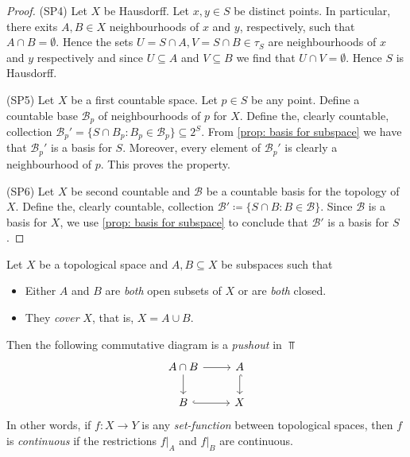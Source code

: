 \begin{proof}
(SP4) Let \(X\) be Hausdorff. Let \(x, y \in S\) be distinct points. In
particular, there exits \(A, B \in X\) neighbourhoods of \(x\) and \(y\),
respectively, such that \(A \cap B = \emptyset\). Hence the sets \(U = S \cap
A, V = S \cap B \in \tau_S\) are neighbourhoods of \(x\) and \(y\)
respectively and since \(U \subseteq A\) and \(V \subseteq B\) we find that
\(U \cap V = \emptyset\). Hence \(S\) is Hausdorff.

(SP5) Let \(X\) be a first countable space. Let \(p \in S\) be any point.
Define a countable base \(\mathcal B_p\) of neighbourhoods of \(p\) for \(X\).
Define the, clearly countable, collection
\(\mathcal B_p' = \{S \cap B_p \colon B_p \in \mathcal B_p\} \subseteq
2^S\). From \cref{prop: basis for subspace} we have that \(\mathcal B_p'\) is a
basis for \(S\). Moreover, every element of \(\mathcal B_p'\) is clearly a
neighbourhood of \(p\). This proves the property.

(SP6) Let \(X\) be second countable and \(\mathcal B\) be a countable basis for
the topology of \(X\). Define the, clearly countable, collection
\(\mathcal B' \coloneq \{S \cap B \colon B \in \mathcal B\}\). Since
\(\mathcal B\) is a basis for \(X\), we use \cref{prop: basis for subspace} to
conclude that \(\mathcal B'\) is a basis for \(S\).
\end{proof}

\begin{proposition}
\label{prop:continuous-from-covering-subspaces}
Let \(X\) be a topological space and \(A, B \subseteq X\) be subspaces such that
\begin{itemize}\setlength\itemsep{0em}
\item Either \(A\) and \(B\) are \emph{both} open subsets of \(X\) or are
  \emph{both} closed.

\item They \emph{cover} \(X\), that is, \(X = A \cup B\).
\end{itemize}
Then the following commutative diagram is a \emph{pushout} in \(\Top\)
\begin{equation}\label{eq:pushout-AcapB}
\begin{tikzcd}
A \cap B \ar[r] \ar[d] & A \ar[d, hook] \\
B \ar[r, hook] & X
\end{tikzcd}
\end{equation}
In other words, if \(f: X \to Y\) is any \emph{set-function} between topological
spaces, then \(f\) is \emph{continuous} if the restrictions \(f|_A\) and
\(f|_B\) are continuous.
\end{proposition}

